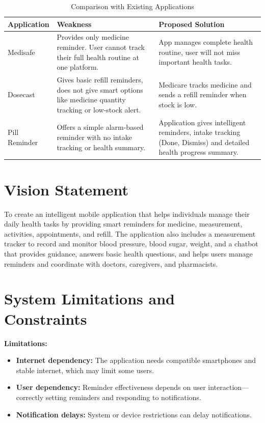 \begin{table}[H]
\centering
\caption{Comparison with Existing Applications}
\label{tab:comparison}
\begin{tabularx}{\textwidth}{|l|X|X|}
\hline
\textbf{Application} & \textbf{Weakness} & \textbf{Proposed Solution} \\ \hline
Medisafe & Provides only medicine reminder. User cannot track their full health routine at one platform. & App manages complete health routine, user will not miss important health tasks. \\ \hline
Dosecast & Gives basic refill reminders, does not give smart options like medicine quantity tracking or low-stock alert. & Medicare tracks medicine and sends a refill reminder when stock is low. \\ \hline
Pill Reminder & Offers a simple alarm-based reminder with no intake tracking or health summary. & Application gives intelligent reminders, intake tracking (Done, Dismiss) and detailed health progress summary. \\ \hline
\end{tabularx}
\end{table}

\section{Vision Statement}
\label{sec:vision}

To create an intelligent mobile application that helps individuals manage their daily health tasks by providing smart reminders for medicine, measurement, activities, appointments, and refill. The application also includes a measurement tracker to record and monitor blood pressure, blood sugar, weight, and a chatbot that provides guidance, answers basic health questions, and helps users manage reminders and coordinate with doctors, caregivers, and pharmacists.

\section{System Limitations and Constraints}
\label{sec:limitations}

\textbf{Limitations:}
\begin{itemize}
    \item \textbf{Internet dependency:} The application needs compatible smartphones and stable internet, which may limit some users.
    \item \textbf{User dependency:} Reminder effectiveness depends on user interaction---correctly setting reminders and responding to notifications.
    \item \textbf{Notification delays:} System or device restrictions can delay notifications.
\end{itemize}

